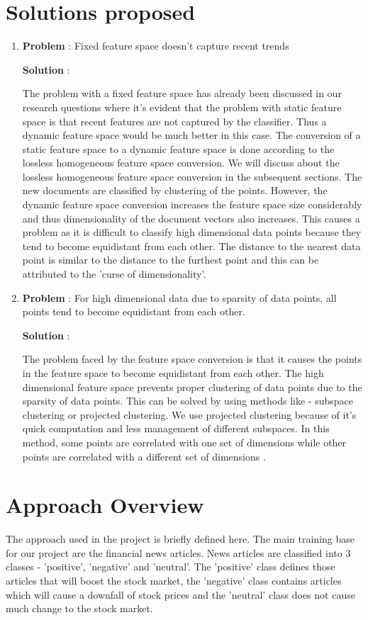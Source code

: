\documentclass[a4paper,12bp]{report}
\begin{document}
\section{Solutions proposed}
\begin{enumerate}
\item \textbf{Problem} : Fixed feature space doesn't capture recent trends

\textbf{Solution} : 

The problem with a fixed feature space has already been discussed in our research questions where it's evident that the problem with static feature space is that recent features are not captured by the classifier. Thus a dynamic feature space would be much better in this case. The conversion of a static feature space to a dynamic feature space is done according to the lossless homogeneous feature space conversion. We will discuss about the lossless homogeneous feature space conversion in the subsequent sections. The new documents are classified by clustering of the points. However, the dynamic feature space conversion increases the feature space size considerably and thus dimensionality of the document vectors also increases. This causes a problem as it is difficult to classify high dimensional data points because they tend to become equidistant from each other. The distance to the nearest data point is similar to the distance to the furthest point \cite{Beyer:1999} and this can be attributed to the 'curse of dimensionality'. 

\item \textbf{Problem} : For high dimensional data due to sparsity of data points, all points tend to become equidistant from each other.

\textbf{Solution} : 

The problem faced by the feature space conversion is that it causes the points in the feature space to become equidistant from each other. The high dimensional feature space prevents proper clustering of data points due to the sparsity of data points. This can be solved by using methods like - subspace clustering or projected clustering. We use projected clustering because of it's quick computation and less management of different subspaces. In this method, some points are correlated with one set of dimensions while other points are correlated with a different set of dimensions \cite{Aggarwal:1999}.
\end{enumerate}

\section{Approach Overview}
The approach used in the project is briefly defined here. The main training base for our project are the financial news articles. News articles are classified into 3 classes - 'positive', 'negative' and 'neutral'. The 'positive' class defines those articles that will boost the stock market, the 'negative' class contains articles which will cause a downfall of stock prices and the 'neutral' class does not cause much change to the stock market.
\end{document}

